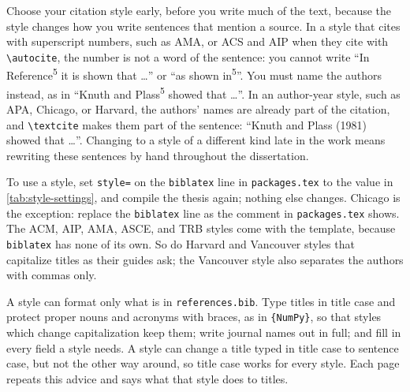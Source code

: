 Choose your citation style early, before you write much of the text, because the style changes how you write sentences that mention a source. In a style that cites with superscript numbers, such as AMA, or ACS and AIP when they cite with \verb+\autocite+, the number is not a word of the sentence: you cannot write ``In Reference\textsuperscript{5} it is shown that \ldots'' or ``as shown in\textsuperscript{5}''. You must name the authors instead, as in ``Knuth and Plass\textsuperscript{5} showed that \ldots''. In an author-year style, such as APA, Chicago, or Harvard, the authors' names are already part of the citation, and \verb+\textcite+ makes them part of the sentence: ``Knuth and Plass (1981) showed that \ldots''. Changing to a style of a different kind late in the work means rewriting these sentences by hand throughout the dissertation.

To use a style, set \texttt{style=} on the \texttt{biblatex} line in \texttt{packages.tex} to the value in \cref{tab:style-settings}, and compile the thesis again; nothing else changes. Chicago is the exception: replace the \texttt{biblatex} line as the comment in \texttt{packages.tex} shows. The ACM, AIP, AMA, ASCE, and TRB styles come with the template, because \texttt{biblatex} has none of its own. So do Harvard and Vancouver styles that capitalize titles as their guides ask; the Vancouver style also separates the authors with commas only.

A style can format only what is in \texttt{references.bib}. Type titles in title case and protect proper nouns and acronyms with braces, as in \texttt{\{NumPy\}}, so that styles which change capitalization keep them; write journal names out in full; and fill in every field a style needs. A style can change a title typed in title case to sentence case, but not the other way around, so title case works for every style. Each page repeats this advice and says what that style does to titles.


